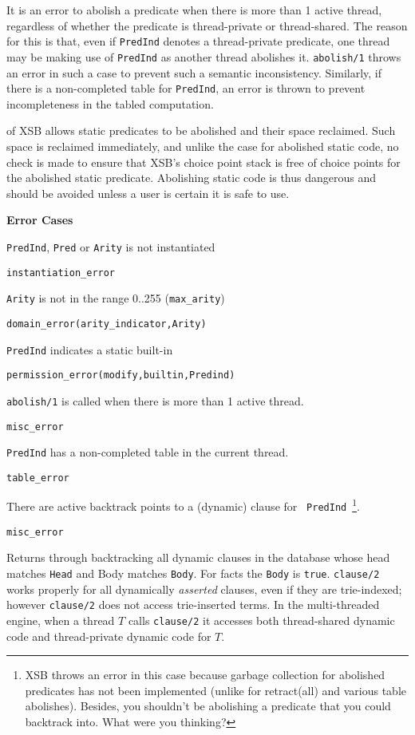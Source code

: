 \begin{description}
It is an error to abolish a predicate when there is more than 1 active
thread, regardless of whether the predicate is thread-private or
thread-shared.  The reason for this is that, even if {\tt PredInd}
denotes a thread-private predicate, one thread may be making use of
{\tt PredInd} as another thread abolishes it.  {\tt abolish/1} throws
an error in such a case to prevent such a semantic inconsistency.
Similarly, if there is a non-completed table for {\tt PredInd}, an
error is thrown to prevent incompleteness in the tabled computation.

\compatibility \version{} of XSB allows static predicates to be
abolished and their space reclaimed.  Such space is reclaimed
immediately, and unlike the case for abolished static code,  no check
is made to ensure that XSB's choice point stack is free of choice
points for the abolished static predicate.  Abolishing static code is
thus dangerous and should be avoided unless a user is certain it is
safe to use.

{\bf Error Cases}
\bi
\item 	{\tt PredInd}, {\tt Pred} or {\tt Arity} is not instantiated
\bi
\item 	{\tt instantiation\_error}
\ei
%
\item 	{\tt Arity} is not in the range 0..255 ({\tt max\_arity})
\bi
\item 	{\tt domain\_error(arity\_indicator,Arity)}
\ei
%
\item 	{\tt PredInd} indicates a static built-in
\bi
\item 	{\tt permission\_error(modify,builtin,Predind)}
\ei
%
\item {\tt abolish/1} is called when there is more than 1 active thread.
\bi
\item {\tt misc\_error}
\ei
%
\item {\tt PredInd} has a non-completed table in the current thread.
\bi
\item {\tt table\_error}
\ei
%
\item There are active backtrack points to a (dynamic) clause for {\tt
  PredInd}~\footnote{XSB throws an error in this case because garbage
  collection for abolished predicates has not been implemented
  (unlike for retract(all) and various table abolishes).  Besides, you
  shouldn't be abolishing a predicate that you could backtrack into.
  What were you thinking?}. 
\bi
\item {\tt misc\_error}
\ei
%
\ei

%
Returns through backtracking all dynamic clauses in the database whose
head matches {\tt Head} and Body matches {\tt Body}.  For facts the
{\tt Body} is {\tt true}.  {\tt clause/2} works properly for all
dynamically {\em asserted} clauses, even if they are trie-indexed;
however {\tt clause/2} does not access trie-inserted terms.  In the
multi-threaded engine, when a thread $T$ calls {\tt clause/2} it
accesses both thread-shared dynamic code and thread-private dynamic
code for $T$.


\end{description}
